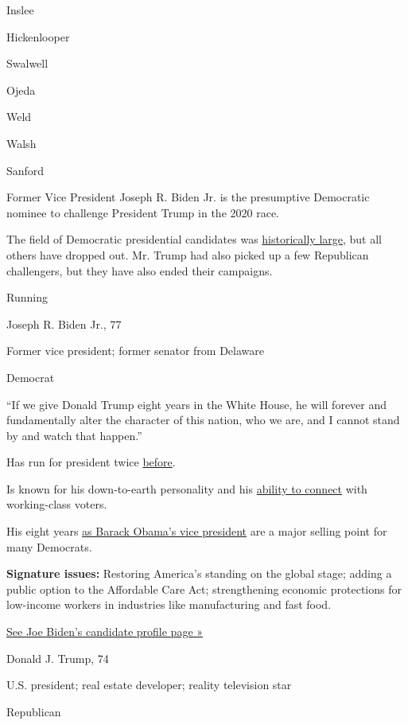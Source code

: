 Inslee

Hickenlooper

Swalwell

Ojeda

Weld

Walsh

Sanford

Former Vice President Joseph R. Biden Jr. is the presumptive Democratic
nominee to challenge President Trump in the 2020 race.

The field of Democratic presidential candidates was
\href{https://www.nytimes.com/interactive/2019/02/14/us/politics/2020-democratic-candidates-president.html}{historically
large}, but all others have dropped out. Mr. Trump had also picked up a
few Republican challengers, but they have also ended their campaigns.

Running

Joseph R. Biden Jr., 77

Former vice president; former senator from Delaware

Democrat

``If we give Donald Trump eight years in the White House, he will
forever and fundamentally alter the character of this nation, who we
are, and I cannot stand by and watch that happen.''

Has run for president twice
\href{https://www.nytimes.com/2019/06/03/us/politics/biden-1988-presidential-campaign.html}{before}.

Is known for his down-to-earth personality and his
\href{https://www.nytimes.com/2019/11/19/us/politics/joe-biden-working-class.html}{ability
to connect} with working-class voters.

His eight years
\href{https://www.nytimes.com/2019/08/16/us/politics/biden-obama-history.html}{as
Barack Obama's vice president} are a major selling point for many
Democrats.

\textbf{Signature issues:} Restoring America's standing on the global
stage; adding a public option to the Affordable Care Act; strengthening
economic protections for low-income workers in industries like
manufacturing and fast food.

\href{https://www.nytimes.com/interactive/2020/us/elections/joe-biden.html}{See
Joe Biden's candidate profile page »}

Donald J. Trump, 74

U.S. president; real estate developer; reality television star

Republican

